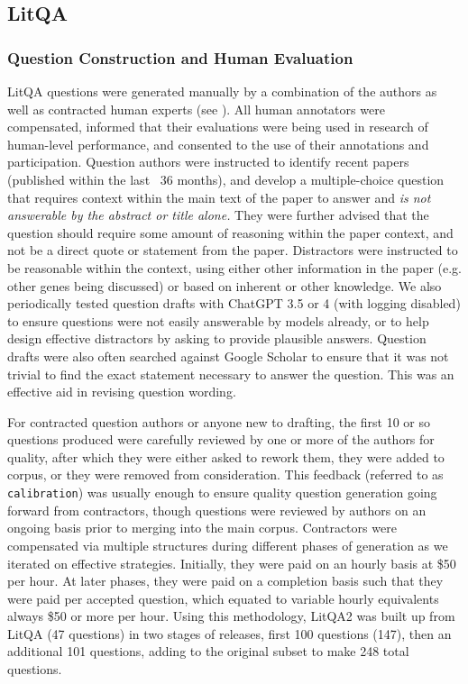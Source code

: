 \subsection{LitQA}

\subsubsection{Question Construction and Human Evaluation} \label{sec:question_evaluators}

LitQA questions were generated manually by a combination of the authors as well as contracted human experts (see \cite{laurent2024lab}). All human annotators were compensated, informed that their evaluations were being used in research of human-level performance, and consented to the use of their annotations and participation. Question authors were instructed to identify recent papers (published within the last ~36 months), and develop a multiple-choice question that requires context within the main text of the paper to answer and \textit{is not answerable by the abstract or title alone.} They were further advised that the question should require some amount of reasoning within the paper context, and not be a direct quote or statement from the paper. Distractors were instructed to be reasonable within the context, using either other information in the paper (e.g. other genes being discussed) or based on inherent or other knowledge. We also periodically tested question drafts with ChatGPT 3.5 or 4 (with logging disabled) to ensure questions were not easily answerable by models already, or to help design effective distractors by asking to provide plausible answers. Question drafts were also often searched against Google Scholar to ensure that it was not trivial to find the exact statement necessary to answer the question. This was an effective aid in revising question wording.

For contracted question authors or anyone new to drafting, the first 10 or so questions produced were carefully reviewed by one or more of the authors for quality, after which they were either asked to rework them, they were added to corpus, or they were removed from consideration. This feedback (referred to as \verb|calibration|) was usually enough to ensure quality question generation going forward from contractors, though questions were reviewed by authors on an ongoing basis prior to merging into the main corpus. Contractors were compensated via multiple structures during different phases of generation as we iterated on effective strategies. Initially, they were paid on an hourly basis at \$50 per hour. At later phases, they were paid on a completion basis such that they were paid per accepted question, which equated to variable hourly equivalents always \$50 or more per hour. Using this methodology, LitQA2 was built up from LitQA (47 questions) in two stages of releases, first 100 questions (147), then an additional 101 questions, adding to the original subset to make 248 total questions. 

